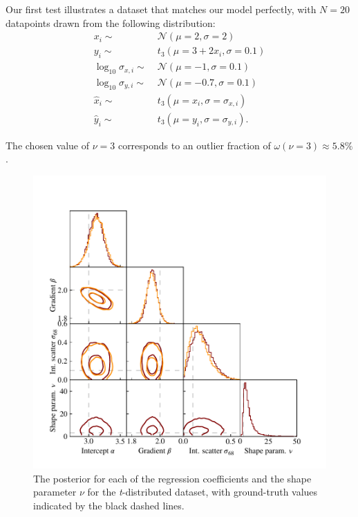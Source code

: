 \documentclass[fleqn,usenatbib]{mnras}
\begin{document}
Our first test illustrates a dataset that matches our model perfectly, with $N =
20$ datapoints drawn from the following distribution:
\begin{align}
    x_i \sim&\; \mathcal N (\mu = 2, \sigma = 2) \\
    y_i \sim&\; t_{3} (\mu = 3 + 2 x_i, \sigma = 0.1) \\
    \log_{10} \sigma_{x, i} \sim&\; \mathcal N (\mu = -1, \sigma = 0.1) \\
    \log_{10} \sigma_{y, i} \sim&\; \mathcal N (\mu = -0.7, \sigma = 0.1) \\
    \hat{x}_i \sim&\; t_{3} (\mu = x_i, \sigma = \sigma_{x, i}) \\
    \hat{y}_i \sim&\; t_{3} (\mu = y_i, \sigma = \sigma_{y, i}).
\end{align}

The chosen value of $\nu = 3$ corresponds to an outlier fraction of $\omega(\nu = 3)
\approx 5.8 \%$.


\begin{figure}
    \includegraphics[width=\columnwidth]{graphics/corner_t.pdf}
    \caption{The posterior for each of the regression coefficients and the shape
    parameter $\nu$ for the \textit{t}-distributed dataset, with ground-truth
    values indicated by the black dashed lines.}
    \label{fig:results.t.corner}
\end{figure}
\end{document}
